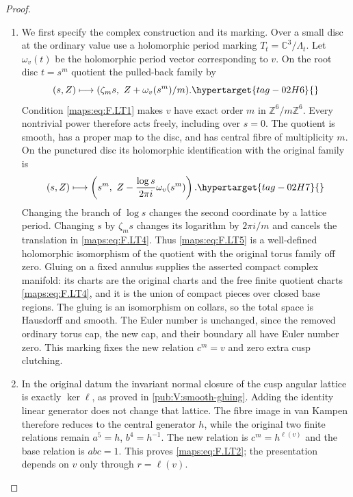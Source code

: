 \documentclass[11pt,a4paper]{article}
\numberwithin{equation}{section}
\theoremstyle{definition}
\begin{document}
\begin{proof}
\begin{enumerate}[label=\arabic*.]
\item We first specify the complex construction and its marking.
Over a small disc at the ordinary value use a holomorphic
period marking
$T_t=\mathbb C^3/\Lambda_t$.
Let $\omega_v(t)$ be the holomorphic period vector
corresponding to $v$.
On the root disc $t=s^m$ quotient the pulled-back family by
\begin{equation}
 (s,Z)\longmapsto
   (\zeta_m s,\ Z+\omega_v(s^m)/m).
\hypertarget{tag-02H6}{}\label{maps:eq:F.LT4}
\end{equation}
Condition \eqref{maps:eq:F.LT1} makes $v$ have exact order $m$
in $\mathbb Z^6/m\mathbb Z^6$.
Every nontrivial power therefore acts freely, including
over $s=0$.
The quotient is smooth, has a proper map to the disc,
and has central fibre of multiplicity $m$.
On the punctured disc its holomorphic identification with
the original family is
\begin{equation}
 (s,Z)\longmapsto
 \left(s^m,\ Z-\frac{\log s}{2\pi i}\omega_v(s^m)\right).
\hypertarget{tag-02H7}{}\label{maps:eq:F.LT5}
\end{equation}
Changing the branch of $\log s$ changes the second
coordinate by a lattice period.
Changing $s$ by $\zeta_m s$ changes its logarithm by
$2\pi i/m$ and cancels the translation in \eqref{maps:eq:F.LT4}.
Thus \eqref{maps:eq:F.LT5} is a well-defined holomorphic isomorphism
of the quotient with the original torus family off zero.
Gluing on a fixed annulus supplies the asserted compact
complex manifold: its charts are the original charts
and the free finite quotient charts \eqref{maps:eq:F.LT4}, and it is
the union of compact pieces over closed base regions.
The gluing is an isomorphism on collars, so the total
space is Hausdorff and smooth.
The Euler number is unchanged, since the removed
ordinary torus cap, the new cap, and their boundary
all have Euler number zero.
This marking fixes the new relation $c^m=v$ and
zero extra cusp clutching.

\item In the original datum the invariant normal closure
of the cusp angular lattice is exactly $\ker\ell$,
as proved in \cref{pub:V:smooth-gluing}.
Adding the identity linear generator does not change
that lattice.
The fibre image in van Kampen therefore reduces to
the central generator $h$, while the original two
finite relations remain $a^5=h$, $b^4=h^{-1}$.
The new relation is $c^m=h^{\ell(v)}$ and the base
relation is $abc=1$.
This proves \eqref{maps:eq:F.LT2}; the presentation depends on $v$ only through $r=\ell(v)$.


\end{enumerate}
\end{proof}
\end{document}
